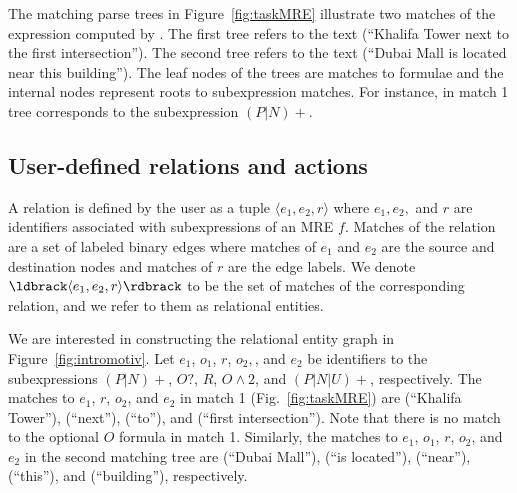 

The matching parse trees in Figure~\ref{fig:taskMRE} illustrate two matches of the expression computed by \framework.
The first tree refers to the text 
(``Khalifa Tower next to the first intersection'').
The second tree refers to the text 
(``Dubai Mall is located near this building'').
The leaf nodes of the trees are matches to formulae and the internal nodes represent roots to subexpression matches.
For instance,  in match 1 tree corresponds to the subexpression $(P|N)+$.

\vspace{-1em}
\subsection{User-defined relations and actions}
\label{sec:relations-actions}

A relation is defined by the user as a tuple 
$\langle e_1,e_2,r\rangle$ where 
$e_1,e_2,$ and $r$ are identifiers associated with 
subexpressions of an MRE $f$.
Matches of the relation are a set of labeled binary edges
where matches of $e_1$ and $e_2$ are the source and destination nodes
and matches of $r$ are the edge labels.
We denote $\ldbrack \langle e_1,e_2,r\rangle \rdbrack$ to be the set of matches of the corresponding relation, 
and we refer to them as relational entities.

We are interested in constructing the relational entity graph in Figure~\ref{fig:intromotiv}.
Let $e_1$, $o_1$, $r$, $o_2,$, and $e_2$ be identifiers to the subexpressions 
$(P|N)+$, $O?$, $R$, $O\wedge 2$, and $(P|N|U)+$, respectively.
The matches to $e_1$, $r$, $o_2$, and $e_2$ in match 1 (Fig.~\ref{fig:taskMRE}) are  (``Khalifa Tower''),  (``next''),  (``to''), and  (``first intersection'').
Note that there is no match to the optional $O$ formula in match 1.
Similarly, the matches to $e_1$, $o_1$, $r$, $o_2$, and $e_2$ in the second matching tree are  (``Dubai Mall''),  (``is located''),  (``near''),  (``this''), and  (``building''), respectively.

